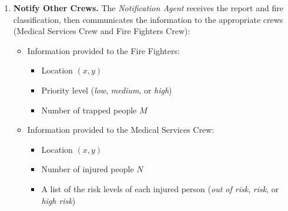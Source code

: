\begin{enumerate}
    \item \textbf{Notify Other Crews.} 
    The \textit{Notification Agent} receives the report and fire classification, then communicates the information to the appropriate crews 
    (Medical Services Crew and Fire Fighters Crew):
    \begin{itemize}
        \item Information provided to the Fire Fighters:
        \begin{itemize}
            \item Location \((x, y)\)
            \item Priority level (\textit{low}, \textit{medium}, or \textit{high})
            \item Number of trapped people $M$
        \end{itemize}
        \item Information provided to the Medical Services Crew:
        \begin{itemize}
            \item Location \((x, y)\)
            \item Number of injured people $N$
            \item A list of the risk levels of each injured person (\textit{out of risk}, \textit{risk}, or \textit{high risk})
        \end{itemize}
    \end{itemize}

\end{enumerate}
